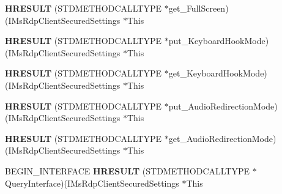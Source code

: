 \begin{DoxyCompactItemize}
\item 
\mbox{\label{struct_i_ms_rdp_client_secured_settings_vtbl_a968e461d61add785407203ec1afaa147}} 
{\bfseries H\+R\+E\+S\+U\+LT} (S\+T\+D\+M\+E\+T\+H\+O\+D\+C\+A\+L\+L\+T\+Y\+PE $\ast$get\+\_\+\+Full\+Screen)(I\+Ms\+Rdp\+Client\+Secured\+Settings $\ast$This
\item 
\mbox{\label{struct_i_ms_rdp_client_secured_settings_vtbl_abe3be6d51cec2d2261766189e9dc6ee0}} 
{\bfseries H\+R\+E\+S\+U\+LT} (S\+T\+D\+M\+E\+T\+H\+O\+D\+C\+A\+L\+L\+T\+Y\+PE $\ast$put\+\_\+\+Keyboard\+Hook\+Mode)(I\+Ms\+Rdp\+Client\+Secured\+Settings $\ast$This
\item 
\mbox{\label{struct_i_ms_rdp_client_secured_settings_vtbl_aebd0a64b7be52e170254d4e9308d3152}} 
{\bfseries H\+R\+E\+S\+U\+LT} (S\+T\+D\+M\+E\+T\+H\+O\+D\+C\+A\+L\+L\+T\+Y\+PE $\ast$get\+\_\+\+Keyboard\+Hook\+Mode)(I\+Ms\+Rdp\+Client\+Secured\+Settings $\ast$This
\item 
\mbox{\label{struct_i_ms_rdp_client_secured_settings_vtbl_a709b6d83cfbdd125f300b5ef6fda1359}} 
{\bfseries H\+R\+E\+S\+U\+LT} (S\+T\+D\+M\+E\+T\+H\+O\+D\+C\+A\+L\+L\+T\+Y\+PE $\ast$put\+\_\+\+Audio\+Redirection\+Mode)(I\+Ms\+Rdp\+Client\+Secured\+Settings $\ast$This
\item 
\mbox{\label{struct_i_ms_rdp_client_secured_settings_vtbl_abe28d686b44367034a081ca531fb33ac}} 
{\bfseries H\+R\+E\+S\+U\+LT} (S\+T\+D\+M\+E\+T\+H\+O\+D\+C\+A\+L\+L\+T\+Y\+PE $\ast$get\+\_\+\+Audio\+Redirection\+Mode)(I\+Ms\+Rdp\+Client\+Secured\+Settings $\ast$This
\item 
\mbox{\label{struct_i_ms_rdp_client_secured_settings_vtbl_aeab30069368ed9b4132cd1d2942e7143}} 
B\+E\+G\+I\+N\+\_\+\+I\+N\+T\+E\+R\+F\+A\+CE {\bfseries H\+R\+E\+S\+U\+LT} (S\+T\+D\+M\+E\+T\+H\+O\+D\+C\+A\+L\+L\+T\+Y\+PE $\ast$Query\+Interface)(I\+Ms\+Rdp\+Client\+Secured\+Settings $\ast$This
\item 
\mbox{\label{struct_i_ms_rdp_client_secured_settings_vtbl_a1850346ab2ec35defb0a23e0095edaaf}} 

\end{DoxyCompactItemize}
